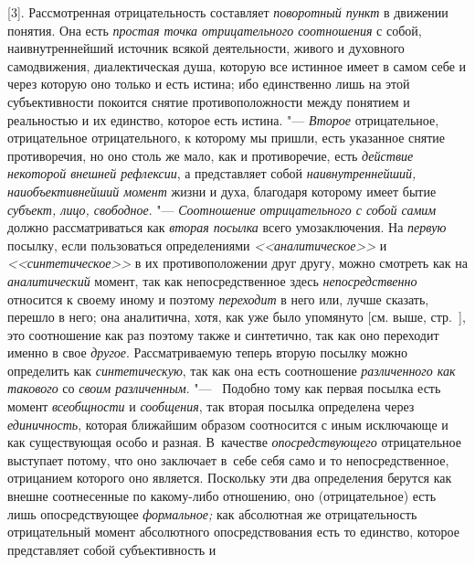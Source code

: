 [3]. Рассмотренная отрицательность составляет {\em поворотный пункт} в
движении понятия. Она есть {\em простая
точка отрицательного соотношения} с собой, наивнутреннейший
источник всякой деятельности, живого и духовного самодвижения,
диалектическая душа, которую все истинное имеет в самом себе и через
которую оно только и есть истина; ибо единственно лишь на этой
субъективности покоится снятие противоположности между понятием и
реальностью и их единство, которое есть истина. "--- {\em Второе}
отрицательное, отрицательное отрицательного, к которому мы
пришли, есть указанное снятие противоречия, но оно столь же мало, как и
противоречие, есть {\em действие
некоторой внешней рефлексии}, а представляет собой
{\em наивнутреннейший, наиобъективнейший
момент} жизни и духа, благодаря которому имеет бытие
{\em субъект, лицо, свободное}. "--- {\em Соотношение отрицательного с собой
самим} должно рассматриваться как {\em вторая посылка} всего умозаключения. На
{\em первую} посылку, если пользоваться определениями
{\em <<аналитическое>>} и {\em <<синтетическое>>} в
их противоположении друг другу, можно смотреть как на {\em аналитический}
момент, так как непосредственное здесь {\em непосредственно}
относится к своему иному и поэтому {\em переходит} в него
или, лучше сказать, перешло в него; она аналитична, хотя, как уже было
упомянуто [см. выше, стр.~\pageref{bkm:bmpg224a}], это
соотношение как раз поэтому также и синтетично, так как оно переходит
именно в свое {\em другое}. Рассматриваемую теперь вторую
посылку можно определить как {\em синтетическую}, так
как она есть соотношение {\em различенного как такового} со {\em своим
различенным}. "--- ~Подобно тому как первая посылка есть момент
{\em всеобщности} и {\em сообщения}, так
вторая посылка определена через {\em единичность},
которая ближайшим образом соотносится с иным исключающе и
как существующая особо и разная. В~качестве {\em опосредствующего}
отрицательное выступает потому, что оно заключает в~себе себя
само и то непосредственное, отрицанием которого оно
является. Поскольку эти два определения берутся как внешне соотнесенные по
какому-либо отношению, оно (отрицательное) есть лишь опосредствующее
{\em формальное;} как
абсолютная же отрицательность отрицательный момент абсолютного
опосредствования есть то единство, которое представляет собой субъективность и
